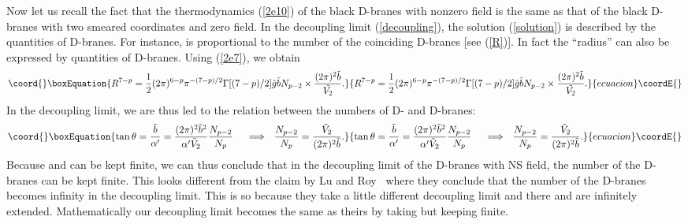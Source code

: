 \documentclass[a4paper,12pt]{article}
\begin{document}
Now let us recall the fact that the thermodynamics (\ref{2e10}) of the
black D\coordHE{}-branes with nonzero \coordHE{} field is the same as that of the
black D\coordHE{}-branes with two smeared coordinates and zero
\coordHE{} field. In the decoupling limit (\ref{decoupling}), the solution
(\ref{solution}) is described by the quantities of D\coordHE{}-branes. For
instance, \coordHE{} is proportional to the number \coordHE{} of the coinciding
D\coordHE{}-branes [see (\ref{R})]. In fact the ``radius'' \coordHE{} can also be
expressed by quantities of D\coordHE{}-branes. Using (\ref{2e7}), we obtain
\begin{equation}\coord{}\boxEquation{
\label{R2}
R^{7-p} = \frac{1}{2}(2\pi)^{6-p}\pi^{-(7-p)/2}\Gamma[(7-p)/2]
    \tilde{g}\tilde{b}N_{p-2}\times \frac{(2\pi)^2\tilde{b}}{\tilde{V_2}}.
}{
R^{7-p} = \frac{1}{2}(2\pi)^{6-p}\pi^{-(7-p)/2}\Gamma[(7-p)/2]
    \tilde{g}\tilde{b}N_{p-2}\times \frac{(2\pi)^2\tilde{b}}{\tilde{V_2}}.
}{ecuacion}\coordE{}\end{equation}
In the decoupling limit, we are thus led to the relation between the numbers
of D\coordHE{}- and D\coordHE{}-branes:
\begin{equation}\coord{}\boxEquation{
\label{number}
\tan\theta = \frac{\tilde{b}}{\alpha'} = \frac{(2\pi)^2\tilde{b}^2}
  {\alpha'\tilde{V}_2}\frac{N_{p-2}}{N_p}\ \ \ \
 \Longrightarrow \ \ \frac{N_{p-2}}{N_p}
 = \frac{\tilde{V}_2}{(2\pi)^2\tilde{b}}.
}{
\tan\theta = \frac{\tilde{b}}{\alpha'} = \frac{(2\pi)^2\tilde{b}^2}
  {\alpha'\tilde{V}_2}\frac{N_{p-2}}{N_p}\ \ \ \
 \Longrightarrow \ \ \frac{N_{p-2}}{N_p}
 = \frac{\tilde{V}_2}{(2\pi)^2\tilde{b}}.
}{ecuacion}\coordE{}\end{equation}
Because \myHighlight{$\tilde{V}_2$}\coordHE{} and \coordHE{} can be kept finite, we can thus
conclude that in the decoupling limit of the D\coordHE{}-branes with NS \coordHE{} field,
the number of the D\coordHE{}-branes can be kept finite. This looks different
from the claim by Lu and Roy~\cite{Lu} where they conclude that the number
of the D\myHighlight{$(p-2)$}\coordHE{}-branes becomes infinity in the decoupling limit. This is
so because they take a little different decoupling limit and there
\myHighlight{$\tilde{x}_{p-1}$}\coordHE{} and \myHighlight{$\tilde{x}_p$}\coordHE{} are infinitely extended. Mathematically
our decoupling limit becomes the same as theirs by taking
\myHighlight{$\tilde{V}_2 \rightarrow \infty$}\coordHE{} but keeping \myHighlight{$N_{p-2}/\tilde{V}_2 =
N_p/(2\pi)^2\tilde{b}$}\coordHE{} finite.
\end{document}
